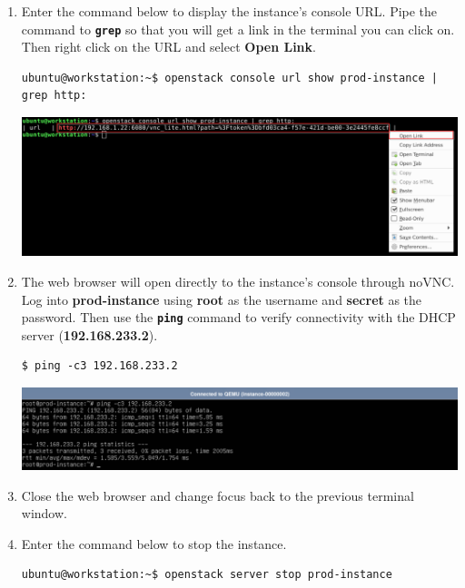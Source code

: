\documentclass[letterpaper, 12pt]{article}
\begin{document}
\begin{enumerate}
    \item Enter the command below to display the instance's console URL. Pipe the command to \textbf{\texttt{grep}} so
    that you will get a link in the terminal you can click on. Then right click on the URL and select \textbf{Open
    Link}.
\begin{lstlisting}
ubuntu@workstation:~$ openstack console url show prod-instance | grep http:
\end{lstlisting}

    \begin{center}
        \includegraphics[width=\linewidth]{images/part2/step15.png}
    \end{center}

    \item The web browser will open directly to the instance's console through noVNC. Log into \textbf{prod-instance}
    using \textbf{root} as the username and \textbf{secret} as the password. Then use the \textbf{\texttt{ping}}
    command to verify connectivity with the DHCP server (\textbf{192.168.233.2}).
\begin{lstlisting}
$ ping -c3 192.168.233.2
\end{lstlisting}

    \begin{center}
        \includegraphics[width=\linewidth]{images/part2/step16.png}
    \end{center}

    \item Close the web browser and change focus back to the previous terminal window.
    
    \item Enter the command below to stop the instance.
\begin{lstlisting}
ubuntu@workstation:~$ openstack server stop prod-instance
\end{lstlisting}


\end{enumerate}
\end{document}
